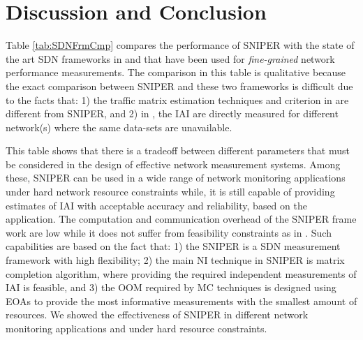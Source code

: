\section{Discussion and Conclusion}  \label{sec:Conclu}
Table \ref{tab:SDNFrmCmp} compares the performance of SNIPER with the state of the art SDN frameworks in \cite{IF14iSTAMP:2014} and \cite{Adrichen:2014} that have been used for \emph{fine-grained} network performance measurements. The comparison in this table is qualitative because the exact comparison between SNIPER and these two frameworks is difficult due to the facts that: 1) the traffic matrix estimation techniques and criterion in \cite{IF14iSTAMP:2014} are different from SNIPER, and 2) in \cite{Adrichen:2014}, the IAI are directly measured for different network(s) where the same data-sets are unavailable.

This table shows that there is a tradeoff between different parameters that must be considered in the design of effective network measurement systems. Among these, SNIPER can be used in a wide range of network monitoring applications under hard network resource constraints while, it is still capable of providing estimates of IAI with acceptable accuracy and reliability, based on the application. The computation and communication overhead of the SNIPER frame work are low while it does not suffer from feasibility constraints as in \cite{IF14iSTAMP:2014}. Such capabilities are based on the fact that: 1) the SNIPER is a SDN measurement framework with high flexibility; 2) the main NI technique in SNIPER is matrix completion algorithm, where providing the required independent measurements of IAI is feasible, and 3) the OOM required by MC techniques is designed using EOAs to provide the most informative measurements with the smallest amount of resources. We showed the effectiveness of SNIPER in different network monitoring applications and under hard resource constraints.

